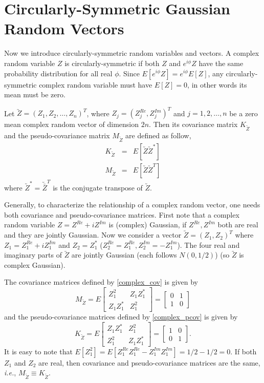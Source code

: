 \section{Circularly-Symmetric Gaussian Random Vectors}

Now we introduce circularly-symmetric random variables and vectors. A complex random variable $Z$ is circularly-symmetric if both $Z$ and $e^{i\phi} Z$ have the same probability distribution for all real $\phi$.  Since $E[e^{i\phi}Z] = e^{i\phi}E[Z]$, any circularly-symmetric complex random variable must have $E[Z]=0$, in other words its mean must be zero.

Let $\utilde{Z} = (Z_1, Z_2, \ldots, Z_n)^T$, where $Z_j = (Z_j^{Re}, Z_j^{Im})^T$ and $j=1,2,\ldots, n$ be a zero mean complex random vector of dimension $2n$. Then its covariance matrix $K_{\utilde{Z}}$ and the pseudo-covariance matrix $M_{\utilde{Z}}$ are defined as follow,
\begin{eqnarray}
\label{complex_cov}
K_{\utilde{Z}} &=& E[\utilde{Z}\utilde{Z}^*]\\
\label{complex_pcov}
M_{\utilde{Z}} &=& E[\utilde{Z}\utilde{Z}^T]
\end{eqnarray}
where $\utilde{Z}^* = \utilde{\bar{Z}}^T$ is the conjugate transpose of $\utilde{Z}$.

Generally, to characterize the relationship of a complex random vector, one needs both covariance and pseudo-covariance matrices. First note that a complex random variable $Z = Z^{Re} + iZ^{Im}$ is (complex) Gaussian, if $Z^{Re}, Z^{Im}$ both are real and they are jointly Gaussian. Now we consider a vector $\utilde{Z}=(Z_1, Z_2)^T$ where $Z_1=Z_1^{Re }+i Z_1^{Im}$ and $Z_2=Z_1^*$ ($Z_2^{Re}=Z_1^{Re }, Z_2^{Im}=-Z_1^{Im}$). The four real and imaginary parts of $\utilde{Z}$ are jointly Gaussian (each follows $N(0,1/2)$) (so $\utilde{Z}$ is complex Gaussian).

The covariance matrices defined by \eqref{complex_cov} is given by
\[
M_{\utilde{Z}} = E \begin{bmatrix}
Z_1^2 & Z_1Z_1^*\\
Z_1Z_1^* & Z_1^2
\end{bmatrix} =
\begin{bmatrix}
0 & 1\\
1 & 0
\end{bmatrix}
\]
and the pseudo-covariance matrices defined by \eqref{complex_pcov} is given by
\[
K_{\utilde{Z}}= E \begin{bmatrix}
Z_1Z_1^*  & Z_1^2\\
Z_1^2     & Z_1Z_1^*
\end{bmatrix} =
\begin{bmatrix}
1 & 0\\
0 & 1
\end{bmatrix}.
\]
It is easy to note that $E[Z_1^2] = E[Z_1^{Re}Z_1^{Re}-Z_1^{Im}Z_1^{Im}] = 1/2 -1/2 = 0$. If both $Z_1$ and $Z_2$ are real, then covariance and pseudo-covariance matrices are the same, {\em i.e.}, $M_{\utilde{Z}} \equiv K_{\utilde{Z}}$. 

